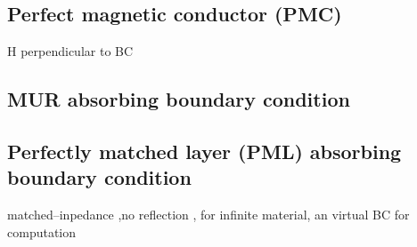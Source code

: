\subsection{Perfect magnetic conductor (PMC)}\label{subsec:PMC}
H perpendicular to BC

\subsection{MUR absorbing boundary condition}\label{subsec:MUR}

\subsection{Perfectly matched layer (PML) absorbing boundary condition}\label{subsec:PML}
matched--inpedance ,no reflection , for infinite  material, an virtual BC for computation


